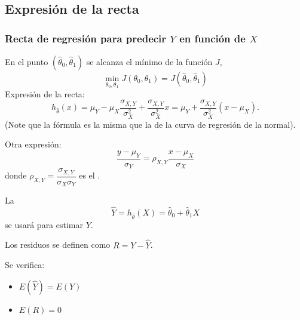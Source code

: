 \subsection{Expresión de la recta}
\subsubsection{Recta de regresión para predecir $Y$ en función de $X$}
En el punto $(\hat{\theta}_0,\hat{\theta}_1)$ se alcanza el mínimo de la función $J$, \[ \min_{\theta_0,\theta_1}J(\theta_0,\theta_1)=J(\hat{\theta}_0,\hat{\theta}_1) \]
Expresión de la recta: \[ h_{\hat{\theta}}(x)=\mu_Y-\mu_X\dfrac{\sigma_{X,Y}}{\sigma_X^2}+\dfrac{\sigma_{X,Y}}{\sigma_X^2}x=\mu_Y+\dfrac{\sigma_{X,Y}}{\sigma_X^2}(x-\mu_X). \] (Note que la fórmula es la misma que la de la curva de regresión de la normal).

Otra expresión: \[ \dfrac{y-\mu_Y}{\sigma_Y}=\rho_{X,Y}\dfrac{x-\mu_X}{\sigma_X} \]donde $\rho_{X,Y}=\dfrac{\sigma_{X,Y}}{\sigma_X\sigma_Y}$ es el .

La \va \[ \hat{Y}=h_{\hat{\theta}}(X)=\hat{\theta}_0+\hat{\theta}_1X \]se usará para estimar $Y$.

Los residuos se definen como $R=Y-\hat{Y}$.

Se verifica: 
\begin{itemize}[label=\color{lightblue}$\to$]
\item $E(\hat{Y})=E(Y)$
\item $E(R)=0$
\end{itemize}